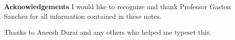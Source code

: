 {\textbf{Acknowledgements}}
I would like to recognize and thank Professor Gaston Sanchez for all information contained in these notes. 

Thanks to Aneesh Durai and any others who helped me typeset this.
